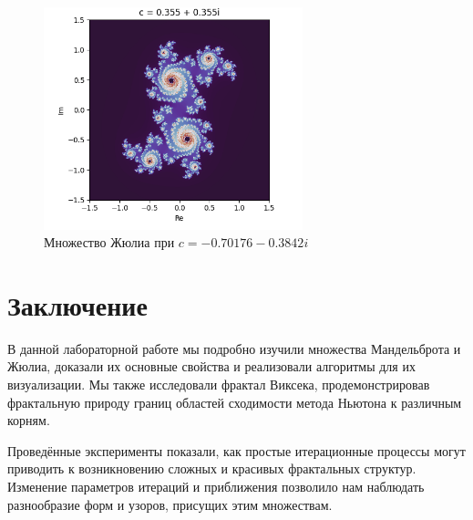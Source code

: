 \documentclass{article}
\begin{document}
	\begin{figure}[H]
		\centering
		\includegraphics[width=0.67\textwidth]{images/julia_c2.png}
		\caption{Множество Жюлиа при $c = -0.70176 - 0.3842i$}
		\label{fig:julia_c2}
	\end{figure}
	
	\newpage
	
	\section{Заключение}
	В данной лабораторной работе мы подробно изучили множества Мандельброта и Жюлиа, доказали их основные свойства и реализовали алгоритмы для их визуализации. Мы также исследовали фрактал Виксека, продемонстрировав фрактальную природу границ областей сходимости метода Ньютона к различным корням.
	
	Проведённые эксперименты показали, как простые итерационные процессы могут приводить к возникновению сложных и красивых фрактальных структур. Изменение параметров итераций и приближения позволило нам наблюдать разнообразие форм и узоров, присущих этим множествам.

	
\end{document}
